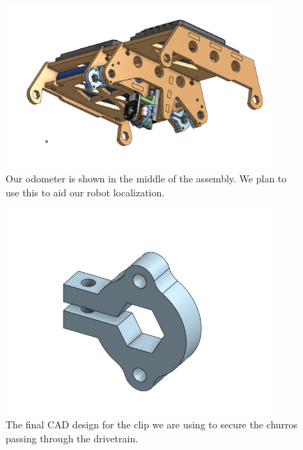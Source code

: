 \begin{figure}[htp]
\centering
\includegraphics[width=0.9\textwidth, angle=0]{Meetings/August/08-08-21/8-8-21_Image4-Odometer - Nathan Forrer.PNG}
\caption{Our odometer is shown in the middle of the assembly. We plan to use this to aid our robot localization.}
\label{fig:080821_4}
\end{figure}

\begin{figure}[htp]
\centering
\includegraphics[width=0.9\textwidth, angle=0]{Meetings/August/08-08-21/8-8-21_Image5-Clip - Nathan Forrer.PNG}
\caption{The final CAD design for the clip we are using to secure the churros passing through the drivetrain.}
\label{fig:080821_5}
\end{figure}

